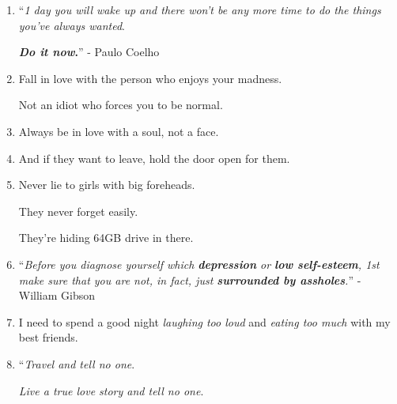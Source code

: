 \documentclass{article}
\numberwithin{equation}{section}
\begin{document}
\begin{enumerate}
    Then stop letting the smallest things ruin your whole entire day.
    
    If you're bored with your daily routine, do something unexpected.
    
    Stop complaining about how alone you are when you're surrounded by people who actually care about you.
    
    Forget all the drama and let go of all the grudges you've been holding.
    
    Stop wasting time lingering over all that you could have, should have and would have done.
    
    Stop spending your days thinking of how much better you could do; stop longing for something that has been and always will be out of your reach.
    
    Just live the days as they come.
    
    Wake up every morning and smile at the wonderful day that awaits you.
    
    Take a risk for once.
    
    Let yourself be happy, because you deserve it.
    \item ``\textit{1 day you will wake up and there won't be any more time to do the things you've always wanted}.
    
    \textbf{\textit{Do it now}.}'' - Paulo Coelho
    \item Fall in love with the person who enjoys your madness.
    
    Not an idiot who forces you to be normal.
    \item Always be in love with a soul, not a face.
    \item And if they want to leave, hold the door open for them.
    \item Never lie to girls with big foreheads.
    
    They never forget easily.
    
    They're hiding 64GB drive in there.
    \item ``\textit{Before you diagnose yourself which \textbf{depression} or \textbf{low self-esteem}, 1st make sure that you are not, in fact, just \textbf{surrounded by assholes}.}'' - William Gibson
    \item I need to spend a good night \textit{laughing too loud} and \textit{eating too much} with my best friends.
    \item ``\textit{Travel and tell no one}.
    
    \textit{Live a true love story and tell no one}.
    

\end{enumerate}
\end{document}
